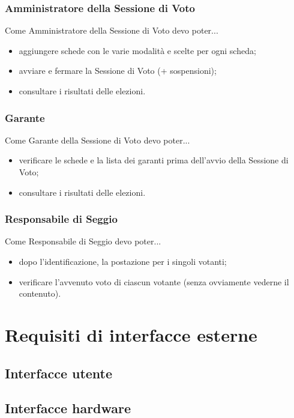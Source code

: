 \documentclass{report}
\begin{document}
\subsubsection{Amministratore della Sessione di Voto}
Come Amministratore della Sessione di Voto devo poter...
\begin{itemize}
	\item aggiungere schede con le varie modalità e scelte per ogni scheda;
	\item avviare e fermare la Sessione di Voto (+ sospensioni);
	\item consultare i risultati delle elezioni.
\end{itemize}

\subsubsection{Garante}
Come Garante della Sessione di Voto devo poter...
\begin{itemize}
	\item verificare le schede e la lista dei garanti prima dell'avvio della Sessione di Voto;
	\item consultare i risultati delle elezioni.
\end{itemize}

\subsubsection{Responsabile di Seggio}
Come Responsabile di Seggio devo poter...
\begin{itemize}
	\item dopo l'identificazione, la postazione per i singoli votanti;
	\item verificare l'avvenuto voto di ciascun votante (senza ovviamente vederne il contenuto).
\end{itemize}




\section{Requisiti di interfacce esterne}


\subsection{Interfacce utente}


\subsection{Interfacce hardware}
\end{document}
